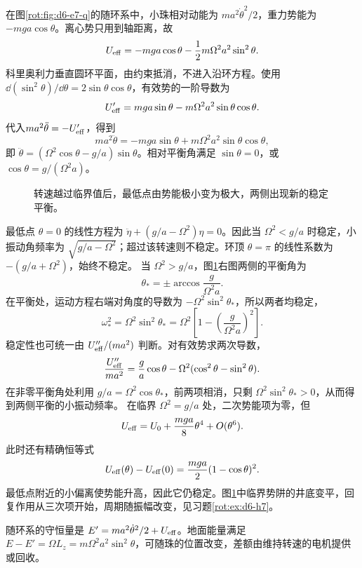 \begin{solution}
在图\ref{rot:fig:d6-e7-q}的随环系中，小珠相对动能为 $ma^2\dot\theta^2/2$，重力势能为 $-mga\cos\theta$。离心势只用到轴距离，故
\[
U_{\rm eff}=-mga\cos\theta-\frac12m\Omega^2a^2\sin^2\theta.
\]
科里奥利力垂直圆环平面，由约束抵消，不进入沿环方程。使用$\dd(\sin^2\theta)/\dd\theta=2\sin\theta\cos\theta$，有效势的一阶导数为
\[
U_{\rm eff}'=mga\sin\theta-m\Omega^2a^2\sin\theta\cos\theta.
\]
代入$ma^2\ddot\theta=-U_{\rm eff}'$，得到
\[
ma^2\ddot\theta=-mga\sin\theta
+m\Omega^2a^2\sin\theta\cos\theta,
\]
即 $\ddot\theta=(\Omega^2\cos\theta-g/a)\sin\theta$。相对平衡角满足
$\sin\theta=0$，或 $\cos\theta=g/(\Omega^2a)$。
\begin{figure}[H]\centering
{}
\caption{转速越过临界值后，最低点由势能极小变为极大，两侧出现新的稳定平衡。}\label{rot:fig:d6-e7-s}
\end{figure}
最低点 $\theta=0$ 的线性方程为
$\ddot\eta+(g/a-\Omega^2)\eta=0$。因此当 $\Omega^2<g/a$ 时稳定，小振动角频率为 $\sqrt{g/a-\Omega^2}$；超过该转速则不稳定。环顶 $\theta=\pi$ 的线性系数为 $-(g/a+\Omega^2)$，始终不稳定。
当 $\Omega^2>g/a$，图\ref{rot:fig:d6-e7-s}右图两侧的平衡角为
\[
\theta_* =\pm\arccos\frac g{\Omega^2a}.
\]
在平衡处，运动方程右端对角度的导数为 $-\Omega^2\sin^2\theta_*$，所以两者均稳定，
\[
\omega_*^2=\Omega^2\sin^2\theta_*
=\Omega^2\left[1-\left(\frac g{\Omega^2a}\right)^2\right].
\]
稳定性也可统一由 $U_{\rm eff}''/(ma^2)$ 判断。对有效势求两次导数，
\[
\frac{U_{\rm eff}''}{ma^2}
=\frac ga\cos\theta-\Omega^2(\cos^2\theta-\sin^2\theta).
\]
在非零平衡角处利用 $g/a=\Omega^2\cos\theta_*$，前两项相消，只剩 $\Omega^2\sin^2\theta_*>0$，从而得到两侧平衡的小振动频率。
在临界 $\Omega^2=g/a$ 处，二次势能项为零，但
\[
U_{\rm eff}=U_0+\frac{mga}{8}\theta^4+O(\theta^6).
\]
此时还有精确恒等式
\[
U_{\rm eff}(\theta)-U_{\rm eff}(0)
=\frac{mga}{2}(1-\cos\theta)^2.
\]
最低点附近的小偏离使势能升高，因此它仍稳定。图\ref{rot:fig:d6-e7-s}中临界势阱的井底变平，回复作用从三次项开始，周期随振幅改变，见习题\ref{rot:ex:d6-h7}。

随环系的守恒量是 $E'=ma^2\dot\theta^2/2+U_{\rm eff}$。地面能量满足
$E-E'=\Omega L_z=m\Omega^2a^2\sin^2\theta$，可随珠的位置改变，差额由维持转速的电机提供或回收。
\end{solution}



